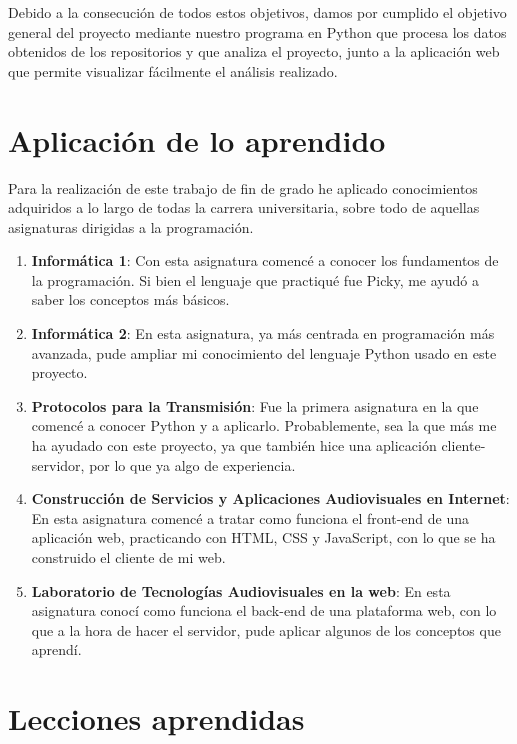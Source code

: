 \documentclass[a4paper, 12pt]{book}
\begin{document}
Debido a la consecución de todos estos objetivos, damos por cumplido el objetivo general del proyecto mediante nuestro programa en Python que procesa los datos obtenidos de los repositorios y que analiza el proyecto, junto a la aplicación web que permite visualizar fácilmente el análisis realizado.

\section{Aplicación de lo aprendido}
\label{sec:aplicacion}

Para la realización de este trabajo de fin de grado he aplicado conocimientos adquiridos a lo largo de todas la carrera universitaria, sobre todo de aquellas asignaturas dirigidas a la programación.

\begin{enumerate}
  \item \textbf{Informática 1}: Con esta asignatura comencé a conocer los fundamentos de la programación. Si bien el lenguaje que practiqué fue Picky, me ayudó a saber los conceptos más básicos.
  \item \textbf{Informática 2}: En esta asignatura, ya más centrada en programación más avanzada, pude ampliar mi conocimiento del lenguaje Python usado en este proyecto.
  \item \textbf{Protocolos para la Transmisión}: Fue la primera asignatura en la que comencé a conocer Python y a aplicarlo. Probablemente, sea la que más me ha ayudado con este proyecto, ya que también hice una aplicación cliente-servidor, por lo que ya algo de experiencia.
  \item \textbf{Construcción de Servicios y Aplicaciones Audiovisuales en Internet}: En esta asignatura comencé a tratar como funciona el front-end de una aplicación web, practicando con HTML, CSS y JavaScript, con lo que se ha construido el cliente de mi web.
  \item \textbf{Laboratorio de Tecnologías Audiovisuales en la web}: En esta asignatura conocí como funciona el back-end de una plataforma web, con lo que a la hora de hacer el servidor, pude aplicar algunos de los conceptos que aprendí.
\end{enumerate}


\section{Lecciones aprendidas}
\label{sec:lecciones_aprendidas}
\end{document}
